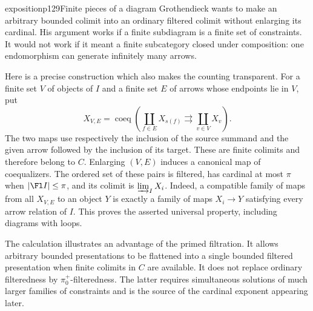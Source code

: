 \begin{dcomment}{exposition}{p129}{Finite pieces of a diagram}
Grothendieck wants to make an arbitrary bounded colimit into an ordinary filtered colimit without enlarging its cardinal. His argument works if a finite subdiagram is a finite set of constraints. It would not work if it meant a finite subcategory closed under composition: one endomorphism can generate infinitely many arrows.

Here is a precise construction which also makes the counting transparent. For a finite set $V$ of objects of $I$ and a finite set $E$ of arrows whose endpoints lie in $V$, put
\[
 X_{V,E}=\operatorname{coeq}\left(
 \coprod_{f\in E}X_{s(f)}\rightrightarrows
 \coprod_{v\in V}X_v\right).
\]
The two maps use respectively the inclusion of the source summand and the given arrow followed by the inclusion of its target. These are finite colimits and therefore belong to $C$. Enlarging $(V,E)$ induces a canonical map of coequalizers. The ordered set of these pairs is filtered, has cardinal at most $\pi$ when $|\Fl I|\leq\pi$, and its colimit is $\varinjlim_I X_i$. Indeed, a compatible family of maps from all $X_{V,E}$ to an object $Y$ is exactly a family of maps $X_i\to Y$ satisfying every arrow relation of $I$. This proves the asserted universal property, including diagrams with loops.

The calculation illustrates an advantage of the primed filtration. It allows arbitrary bounded presentations to be flattened into a single bounded filtered presentation when finite colimits in $C$ are available. It does not replace ordinary filteredness by $\pi_0^+$-filteredness. The latter requires simultaneous solutions of much larger families of constraints and is the source of the cardinal exponent appearing later.
\end{dcomment}

